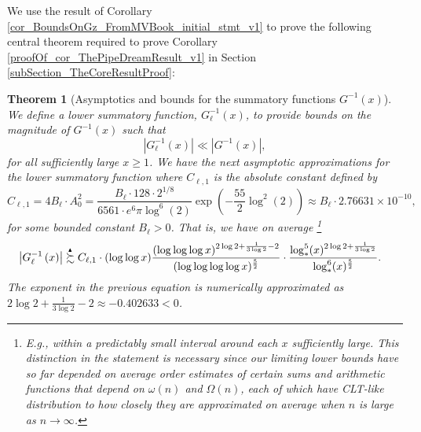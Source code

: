 \documentclass[11pt,reqno,a4letter]{article}
\numberwithin{figure}{section}
\numberwithin{table}{section}
\theoremstyle{plain}
\newtheorem{theorem}{Theorem}
\numberwithin{theorem}{section}
\theoremstyle{definition}
\newcommand{\SuccSim}[0]{\overset{_{\scriptsize{\blacktriangle}}}{\succsim}}
\begin{document}
We use the result of 
Corollary \ref{cor_BoundsOnGz_FromMVBook_initial_stmt_v1} 
to prove the following central theorem required to prove 
Corollary \ref{proofOf_cor_ThePipeDreamResult_v1} in Section \ref{subSection_TheCoreResultProof}: 

\begin{theorem}[Asymptotics and bounds for the summatory functions $G^{-1}(x)$] 
\label{theorem_gInv_GeneralAsymptoticsForms}
We define a lower summatory function, $G_{\ell}^{-1}(x)$, 
to provide bounds on the magnitude of $G^{-1}(x)$ such that 
$$|G_{\ell}^{-1}(x)| \ll |G^{-1}(x)|,$$ for all sufficiently large $x \geq 1$. 
We have the next asymptotic approximations for the lower summatory function where 
$C_{\ell,1}$ is the absolute constant defined by 
\[
C_{\ell,1} = 4B_{\ell} \cdot A_0^2  = 
     \frac{B_{\ell} \cdot 128 \cdot 2^{1/8}}{6561 \cdot e^6 \pi \log^6(2)} 
     \exp\left(-\frac{55}{2} \log^2(2)\right) 
     \approx B_{\ell} \cdot 2.76631 \times 10^{-10}, 
\]
for some bounded constant $B_{\ell} > 0$. 
That is, we have on average \footnote{ 
     E.g., within a predictably small interval around each $x$ sufficiently large. 
     This distinction in the statement is necessary since our limiting lower bounds have 
     so far depended on average order estimates of certain sums and arithmetic functions 
     that depend on $\omega(n)$ and $\Omega(n)$, each of which have CLT-like distribution to 
     how closely they are approximated on average when $n$ is large as $n \rightarrow \infty$. 
}
\begin{align*} 
 & \left\lvert G_{\ell}^{-1}\left(x\right) \right\rvert
     \SuccSim 
     C_{\ell,1} \cdot (\log\log x) \frac{(\log\log\log x)^{2\log 2+\frac{1}{3\log 2} - 2}}{ 
     (\log\log\log\log x)^{\frac{5}{2}}} \cdot \frac{\log_{\ast}^5(x)^{2\log 2 + \frac{1}{3\log 2}}}{ 
     \log_{\ast}^{6}(x)^{\frac{5}{2}}}. 
\end{align*} 
The exponent in the previous equation is numerically approximated as 
$2\log 2 + \frac{1}{3\log 2} -2 \approx -0.402633 < 0$. 
\end{theorem} 
\end{document}
